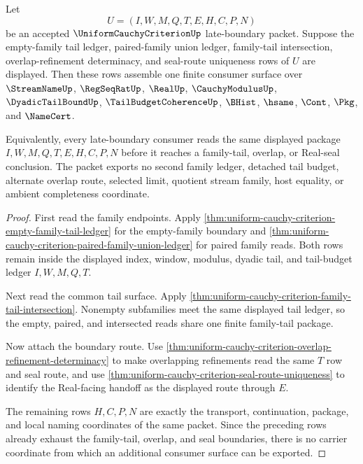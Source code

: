 \begin{theorem}
\label{thm:uniform-cauchy-criterion-late-boundary-formal-target-packet}
Let
$$
U=(I,W,M,Q,T,E,H,C,P,N)
$$
be an accepted $\UniformCauchyCriterionUp$ late-boundary packet. Suppose the empty-family tail ledger, paired-family union ledger, family-tail intersection, overlap-refinement determinacy, and seal-route uniqueness rows of $U$ are displayed. Then these rows assemble one finite consumer surface over $\StreamNameUp$, $\RegSeqRatUp$, $\RealUp$, $\CauchyModulusUp$, $\DyadicTailBoundUp$, $\TailBudgetCoherenceUp$, $\BHist$, $\hsame$, $\Cont$, $\Pkg$, and $\NameCert$.

Equivalently, every late-boundary consumer reads the same displayed package $I,W,M,Q,T,E,H,C,P,N$ before it reaches a family-tail, overlap, or Real-seal conclusion. The packet exports no second family ledger, detached tail budget, alternate overlap route, selected limit, quotient stream family, host equality, or ambient completeness coordinate.
\end{theorem}
\begin{proof}
First read the family endpoints. Apply \autoref{thm:uniform-cauchy-criterion-empty-family-tail-ledger} for the empty-family boundary and \autoref{thm:uniform-cauchy-criterion-paired-family-union-ledger} for paired family reads. Both rows remain inside the displayed index, window, modulus, dyadic tail, and tail-budget ledger $I,W,M,Q,T$.

Next read the common tail surface. Apply \autoref{thm:uniform-cauchy-criterion-family-tail-intersection}. Nonempty subfamilies meet the same displayed tail ledger, so the empty, paired, and intersected reads share one finite family-tail package.

Now attach the boundary route. Use \autoref{thm:uniform-cauchy-criterion-overlap-refinement-determinacy} to make overlapping refinements read the same $T$ row and seal route, and use \autoref{thm:uniform-cauchy-criterion-seal-route-uniqueness} to identify the Real-facing handoff as the displayed route through $E$.

The remaining rows $H,C,P,N$ are exactly the transport, continuation, package, and local naming coordinates of the same packet. Since the preceding rows already exhaust the family-tail, overlap, and seal boundaries, there is no carrier coordinate from which an additional consumer surface can be exported.
\end{proof}

